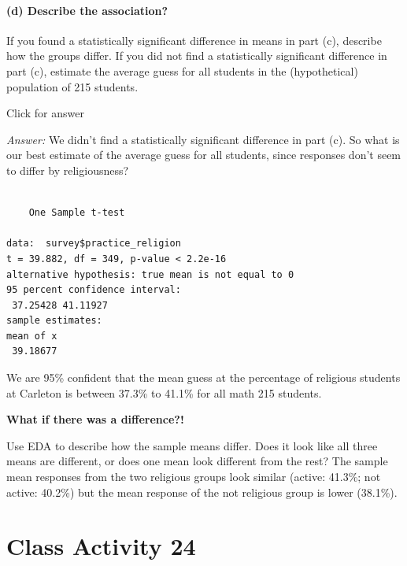 \documentclass[
]{book}
\newenvironment{Shaded}{\begin{snugshade}}{\end{snugshade}}
\newcommand{\FunctionTok}[1]{\textcolor[rgb]{0.00,0.00,0.00}{#1}}
\newcommand{\NormalTok}[1]{#1}
\newcommand{\SpecialCharTok}[1]{\textcolor[rgb]{0.00,0.00,0.00}{#1}}
\begin{document}
\hypertarget{d-describe-the-association}{%
\subsubsection{(d) Describe the association?}\label{d-describe-the-association}}

If you found a statistically significant difference in means in part (c), describe how the groups differ. If you did not find a statistically significant difference in part (c), estimate the average guess for all students in the (hypothetical) population of 215 students.

Click for answer

\emph{Answer:} We didn't find a statistically significant difference in part (c). So what is our best estimate of the average guess for all students, since responses don't seem to differ by religiousness?

\begin{Shaded}
\end{Shaded}

\begin{verbatim}

    One Sample t-test

data:  survey$practice_religion
t = 39.882, df = 349, p-value < 2.2e-16
alternative hypothesis: true mean is not equal to 0
95 percent confidence interval:
 37.25428 41.11927
sample estimates:
mean of x 
 39.18677 
\end{verbatim}

We are 95\% confident that the mean guess at the percentage of religious students at Carleton is between 37.3\% to 41.1\% for all math 215 students.

\textbf{What if there was a difference?!}

Use EDA to describe how the sample means differ. Does it look like all three means are different, or does one mean look different from the rest? The sample mean responses from the two religious groups look similar (active: 41.3\%; not active: 40.2\%) but the mean response of the not religious group is lower (38.1\%).

\hypertarget{class-activity-24}{%
\chapter{Class Activity 24}\label{class-activity-24}}
\end{document}
